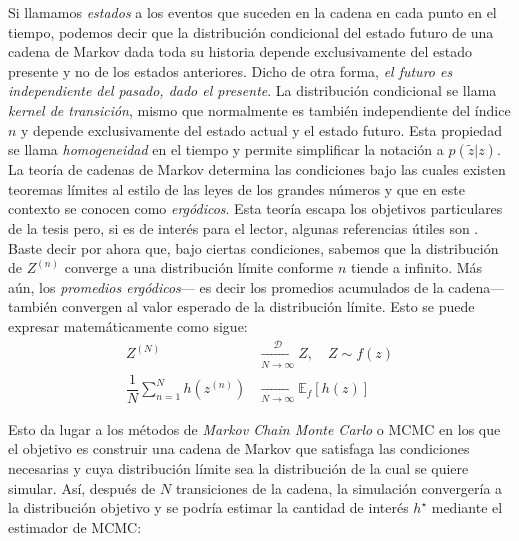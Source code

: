 Si llamamos \textit{estados} a los eventos que suceden en la cadena en cada punto en el tiempo, podemos decir que la distribución condicional del estado futuro de una cadena de Markov dada toda su historia depende exclusivamente del estado presente y no de los estados anteriores. Dicho de otra forma, \textit{el futuro es independiente del pasado, dado el presente}. La distribución condicional se llama \textit{kernel de transición}, mismo que normalmente es también independiente del índice $n$ y depende exclusivamente del estado actual y el estado futuro. Esta propiedad se llama \textit{homogeneidad} en el tiempo y permite simplificar la notación a $p(\tilde{z}|z)$.\\ 

La teoría de cadenas de Markov determina las condiciones bajo las cuales existen teoremas límites al estilo de las leyes de los grandes números y que en este contexto se conocen como \textit{ergódicos}. Esta teoría escapa los objetivos particulares de la tesis pero, si es de interés para el lector, algunas referencias útiles son \textcites{Rincon12,Neal93,Ross96,TaylorKarlin84}. Baste decir por ahora que, bajo ciertas condiciones, sabemos que la distribución de $Z^{(n)}$ converge a una distribución límite conforme $n$ tiende a infinito. Más aún, los \textit{promedios ergódicos}--- es decir los promedios acumulados de la cadena--- también convergen al valor esperado de la distribución límite. Esto se puede expresar matemáticamente como sigue:
\begin{subequations}\label{eq:Teo_Erg}
\begin{align}
Z^{(N)} &\xrightarrow[N\rightarrow\infty]{\mathcal{D}} Z, \quad Z \sim f(z) \label{eq:Teo_Erg_Conv_D} \\
\dfrac{1}{N}\sum\limits_{n=1}^N h\left(z^{(n)}\right) &\xrightarrow[N\rightarrow\infty]{} \mathbb{E}_{f}[h(z)]
\label{eq:Teo_Erg_Conv_Prom}
\end{align}
\end{subequations}

Esto da lugar a los métodos de \textit{Markov Chain Monte Carlo} o MCMC en los que el objetivo es construir una cadena de Markov que satisfaga las condiciones necesarias y cuya distribución límite sea la distribución de la cual se quiere simular. Así, después de $N$ transiciones de la cadena, la simulación convergería a la distribución objetivo y se podría estimar la cantidad de interés $h^\star$ mediante el estimador de MCMC: 

